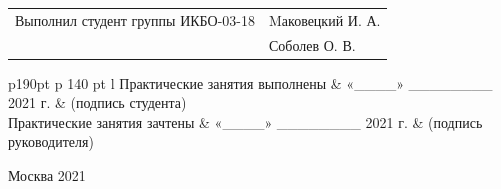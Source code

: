 \begin{titlepage}
\vspace{0,9 cm}

\begin{tabular}{ p{290pt} l }
	\small{Выполнил студент группы ИКБО-03-18} & \small{Mаковецкий И. А.} \\ [0,9 cm]
	\small{Принял & \small{Соболев О. В.} \\
\end{tabular}

\vspace{1,5 cm}

\begin{tabular}{ p{190pt} p {140 pt} l}
	\small{Практические занятия выполнены} & \small{«{\_\_\_\_}» \_\_\_\_\_\_\_\_ 2021 г.} & \tiny{(подпись студента)} \\ [0,9 cm]
	\small{Практические занятия зачтены} & \small{«{\_\_\_\_}» \_\_\_\_\_\_\_\_ 2021 г.} & \tiny{(подпись руководителя)} \\ [0,9 cm]

\end{tabular}

\begin{center}
\vspace*{\fill}
	\small{Москва}
	\small{2021}
\end{center}

\end{titlepage}
